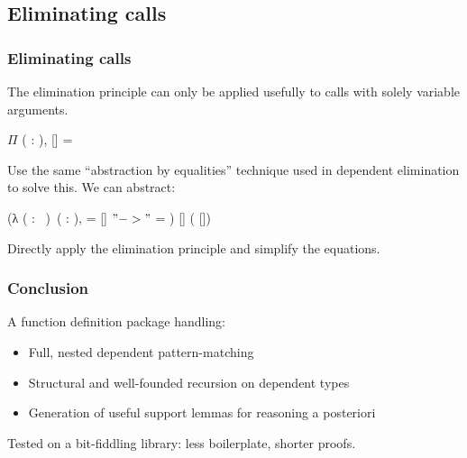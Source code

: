 \subsection{Eliminating calls}

\begin{frame}
  \frametitle{Eliminating calls}

  The elimination principle can only be applied usefully to calls with
  solely variable arguments.

  \begin{center}
    \ensuremath{\Pi}  ( :
    ), 
     [] = 
  \end{center}
  
  \pause
  Use the same ``abstraction by equalities''
  technique used in dependent elimination to solve this.
  We can abstract: 

  \coqdoceol\coqdocindent{1em}
  (λ (  : ~)~( : 
   ),
   = [] $"->"$
     =
  ) \coqdoceol\coqdocindent{2em}
   [] (  [])

  \vspace{1em}

  Directly apply the elimination principle and simplify the equations.

  
\end{frame}


\begin{frame}
  \frametitle{Conclusion}
  
  A function definition package handling:
  \begin{itemize}
  \item Full, nested dependent pattern-matching
  \item Structural and well-founded recursion on dependent types
  \item Generation of useful support lemmas for reasoning a posteriori
  \end{itemize}

  \vspace{1.00em}

  Tested on a bit-fiddling library: less boilerplate, shorter proofs.
\end{frame}

